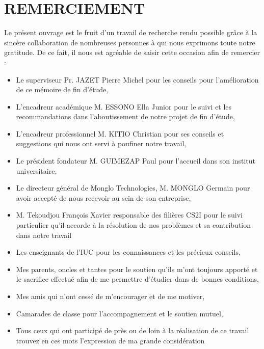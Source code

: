 \chapter*{REMERCIEMENT}

Le présent ouvrage est le fruit d’un travail de recherche rendu possible grâce à la sincère collaboration de nombreuses personnes à qui nous exprimons toute notre gratitude. 
De ce fait, il nous est agréable de saisir cette occasion afin de remercier : 
\begin{itemize}
	\item Le superviseur Pr. JAZET Pierre Michel pour les conseils pour l’amélioration de ce mémoire de fin d’étude, 
	\item L’encadreur académique M. ESSONO Ella Junior pour le suivi et les recommandations dans l’aboutissement de notre projet de fin d’étude, 
	\item L’encadreur professionnel M. KITIO Christian pour ses conseils et suggestions qui nous ont servi à poufiner notre travail, 
	\item Le président fondateur M. GUIMEZAP Paul pour l’accueil dans son institut universitaire, 
	\item Le directeur général de Monglo Technologies, M. MONGLO Germain pour avoir accepté de nous recevoir au sein de son entreprise, 
	\item M. Tekoudjou François Xavier responsable des filières CS2I pour le suivi particulier qu'il accorde à la résolution de nos problèmes et sa contribution dans notre travail
	\item Les enseignants de l’IUC pour les connaissances et les précieux conseils, 
	\item Mes parents, oncles et tantes pour le soutien qu’ils m’ont toujours apporté et le sacrifice effectué afin de me permettre d'étudier dans de bonnes conditions, 
	\item Mes amis qui n’ont cessé de m’encourager et de me motiver, 
	\item Camarades de classe pour l’accompagnement et le soutien mutuel, 
	\item Tous ceux qui ont participé de près ou de loin à la réalisation de ce travail trouvez en ces mots l’expression de ma grande considération 

\end{itemize}